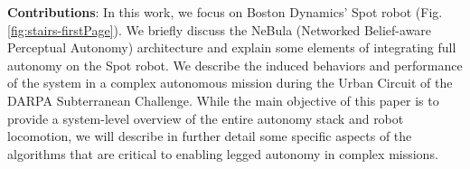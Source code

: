 \documentclass[letterpaper, 10pt, conference]{ieeeconf}      %
\newcommand{\ph}[1]{{\textbf{#1}:}} %
\newcommand{\todo}[1]{{\color{red} #1 }} %
\newcommand{\inst}[1]{{\color{orange} #1 }} %
\newcommand{\rev}[1]{{\color{blue} #1 }} %
\begin{document}



\ph{Contributions} %
In this work, we focus on Boston Dynamics' Spot robot (Fig. \ref{fig:stairs-firstPage}). 
We briefly discuss the NeBula (Networked Belief-aware Perceptual Autonomy) \rev{architecture}and explain some elements of integrating full autonomy on the Spot robot.
We describe the induced behaviors and performance of the system in a complex autonomous mission \rev{during the Urban Circuit of the DARPA Subterranean Challenge.}
While the main objective of this paper is to provide a system-level overview of the entire autonomy stack and robot locomotion, we will describe in further detail some specific aspects of the algorithms that are critical to enabling legged autonomy in complex missions. 
\end{document}
